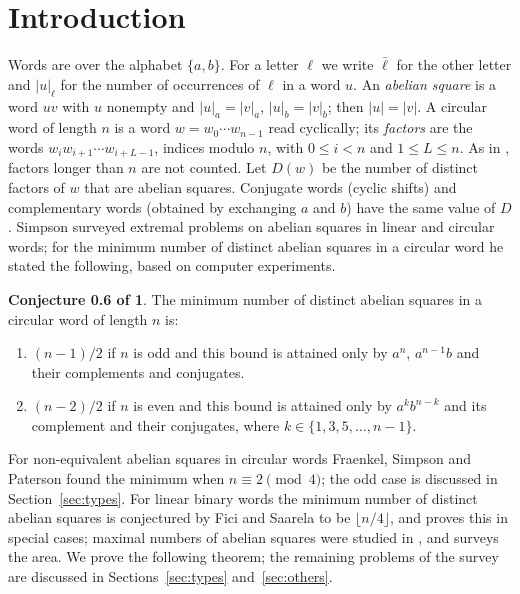\documentclass[11pt,reqno]{amsart}
\theoremstyle{definition}
\newtheorem*{conjecture*}{Conjecture 0.6 of \cite{Sim18}}
\newcommand{\lb}{\bar\ell}
\newcommand{\fl}[1]{\lfloor #1\rfloor}
\begin{document}
\section{Introduction}\label{sec:intro}

Words are over the alphabet $\{a,b\}$. For a letter $\ell$ we write $\lb$ for the other letter and $|u|_\ell$ for the number of occurrences of $\ell$ in a word $u$. An \emph{abelian square} is a word $uv$ with $u$ nonempty and $|u|_a=|v|_a$, $|u|_b=|v|_b$; then $|u|=|v|$. A circular word of length $n$ is a word $w=w_0\cdots w_{n-1}$ read cyclically; its \emph{factors} are the words $w_iw_{i+1}\cdots w_{i+L-1}$, indices modulo $n$, with $0\le i<n$ and $1\le L\le n$. As in \cite{Sim18}, factors longer than $n$ are not counted. Let $D(w)$ be the number of distinct factors of $w$ that are abelian squares. Conjugate words (cyclic shifts) and complementary words (obtained by exchanging $a$ and $b$) have the same value of $D$. Simpson \cite{Sim18} surveyed extremal problems on abelian squares in linear and circular words; for the minimum number of distinct abelian squares in a circular word he stated the following, based on computer experiments.

\begin{conjecture*}
The minimum number of distinct abelian squares in a circular word of length $n$ is:
\begin{enumerate}
\item[(a)] $(n-1)/2$ if $n$ is odd and this bound is attained only by $a^n$, $a^{n-1}b$ and their complements and conjugates.
\item[(b)] $(n-2)/2$ if $n$ is even and this bound is attained only by $a^kb^{n-k}$ and its complement and their conjugates, where $k\in\{1,3,5,\dots,n-1\}$.
\end{enumerate}
\end{conjecture*}

For non-equivalent abelian squares in circular words Fraenkel, Simpson and Paterson \cite{FSP97} found the minimum when $n\equiv 2\pmod 4$; the odd case is discussed in Section~\ref{sec:types}. For linear binary words the minimum number of distinct abelian squares is conjectured by Fici and Saarela to be $\fl{n/4}$, and \cite{FMMS26} proves this in special cases; maximal numbers of abelian squares were studied in \cite{FM15,FMS17}, and \cite{FP23} surveys the area. We prove the following theorem; the remaining problems of the survey are discussed in Sections~\ref{sec:types} and~\ref{sec:others}.
\end{document}

